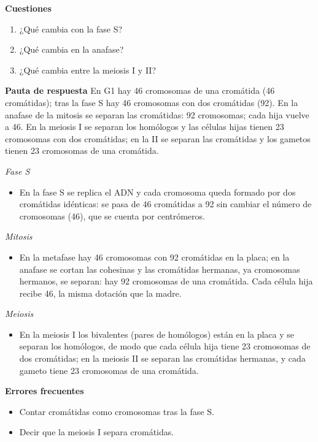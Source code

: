 \documentclass{book}
\begin{document}
\noindent\textbf{Cuestiones}
\begin{enumerate}
\item ¿Qué cambia con la fase S?
\item ¿Qué cambia en la anafase?
\item ¿Qué cambia entre la meiosis I y II?
\end{enumerate}

\noindent\textbf{Pauta de respuesta}
En G1 hay 46 cromosomas de una cromátida (46 cromátidas); tras la fase S hay 46 cromosomas con dos cromátidas (92). En la anafase de la mitosis se separan las cromátidas: 92 cromosomas; cada hija vuelve a 46. En la meiosis I se separan los homólogos y las células hijas tienen 23 cromosomas con dos cromátidas; en la II se separan las cromátidas y los gametos tienen 23 cromosomas de una cromátida.


\noindent\textit{Fase S}
\begin{itemize}
\item En la fase S se replica el ADN y cada cromosoma queda formado por dos cromátidas idénticas: se pasa de 46 cromátidas a 92 sin cambiar el número de cromosomas (46), que se cuenta por centrómeros.
\end{itemize}

\noindent\textit{Mitosis}
\begin{itemize}
\item En la metafase hay 46 cromosomas con 92 cromátidas en la placa; en la anafase se cortan las cohesinas y las cromátidas hermanas, ya cromosomas hermanos, se separan: hay 92 cromosomas de una cromátida. Cada célula hija recibe 46, la misma dotación que la madre.
\end{itemize}

\noindent\textit{Meiosis}
\begin{itemize}
\item En la meiosis I los bivalentes (pares de homólogos) están en la placa y se separan los homólogos, de modo que cada célula hija tiene 23 cromosomas de dos cromátidas; en la meiosis II se separan las cromátidas hermanas, y cada gameto tiene 23 cromosomas de una cromátida.
\end{itemize}

\noindent\textbf{Errores frecuentes}
\begin{itemize}
\item Contar cromátidas como cromosomas tras la fase S.
\item Decir que la meiosis I separa cromátidas.
\end{itemize}
\end{document}
